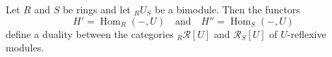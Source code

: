 Let $R$ and $S$ be rings and let ${}_R U_S$ be a bimodule. Then the functors
$$H' = \operatorname{Hom}_R(-, U) \quad \text{and} \quad H'' = \operatorname{Hom}_S(-, U)$$
define a duality between the categories ${}_R \mathcal{R}[U]$ and $\mathcal{R}_S[U]$ of $U$-reflexive modules.
